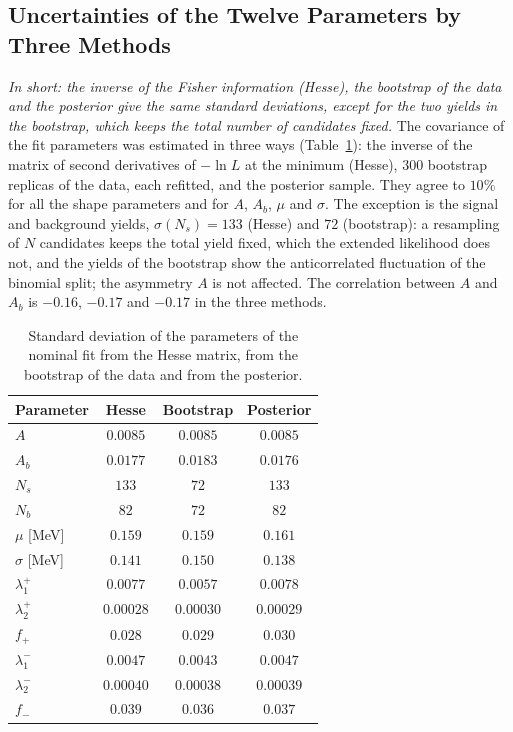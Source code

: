 \subsection{Uncertainties of the Twelve Parameters by Three Methods}
\label{sec:checks_covariance}
\emph{In short: the inverse of the Fisher information (Hesse), the bootstrap of the data and the posterior give the same standard deviations, except for the two yields in the bootstrap, which keeps the total number of candidates fixed.}
The covariance of the fit parameters was estimated in three ways (Table~\ref{tab:checks_covariance}): the inverse of the matrix of second derivatives of $-\ln L$ at the minimum (Hesse), $300$ bootstrap replicas of the data, each refitted, and the posterior sample. They agree to $10\%$ for all the shape parameters and for $A$, $A_b$, $\mu$ and $\sigma$. The exception is the signal and background yields, $\sigma(N_s)=133$ (Hesse) and $72$ (bootstrap): a resampling of $N$ candidates keeps the total yield fixed, which the extended likelihood does not, and the yields of the bootstrap show the anticorrelated fluctuation of the binomial split; the asymmetry $A$ is not affected. The correlation between $A$ and $A_b$ is $-0.16$, $-0.17$ and $-0.17$ in the three methods.

\begin{table}[h]
\centering
\begin{tabular}{lccc}
\toprule
Parameter & Hesse & Bootstrap & Posterior \\
\midrule
$A$ & $0.0085$ & $0.0085$ & $0.0085$ \\
$A_b$ & $0.0177$ & $0.0183$ & $0.0176$ \\
$N_s$ & $133$ & $72$ & $133$ \\
$N_b$ & $82$ & $72$ & $82$ \\
$\mu$ [MeV] & $0.159$ & $0.159$ & $0.161$ \\
$\sigma$ [MeV] & $0.141$ & $0.150$ & $0.138$ \\
$\lambda_1^+$ & $0.0077$ & $0.0057$ & $0.0078$ \\
$\lambda_2^+$ & $0.00028$ & $0.00030$ & $0.00029$ \\
$f_+$ & $0.028$ & $0.029$ & $0.030$ \\
$\lambda_1^-$ & $0.0047$ & $0.0043$ & $0.0047$ \\
$\lambda_2^-$ & $0.00040$ & $0.00038$ & $0.00039$ \\
$f_-$ & $0.039$ & $0.036$ & $0.037$ \\
\bottomrule
\end{tabular}
\caption{Standard deviation of the parameters of the nominal fit from the Hesse matrix, from the bootstrap of the data and from the posterior.}
\label{tab:checks_covariance}
\end{table}

